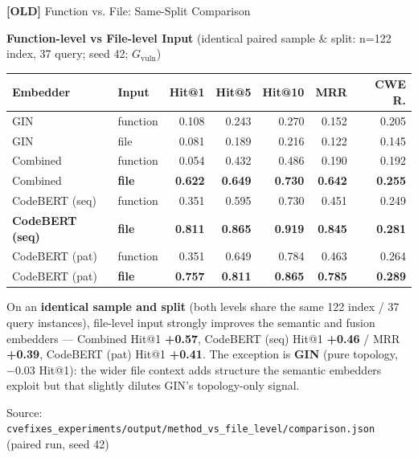 \documentclass[aspectratio=169,10pt]{beamer}
\begin{document}
\begin{frame}{\textbf{[OLD]} Function vs. File: Same-Split Comparison}

  \begin{center}
    {\small\textbf{Function-level vs File-level Input} {\scriptsize(identical paired sample \& split: n=122 index, 37 query; seed 42; $G_{\mathrm{vuln}}$)}}\\[4pt]
  {\scriptsize
  \renewcommand{\arraystretch}{1.15}
  \setlength{\tabcolsep}{4pt}
    \begin{tabular}{llrrrrr}
      \toprule
      \textbf{Embedder} & \textbf{Input} & \textbf{Hit@1} & \textbf{Hit@5} & \textbf{Hit@10} & \textbf{MRR} & \textbf{CWE R.} \\
      \midrule
      GIN & function & 0.108 & 0.243 & 0.270 & 0.152 & 0.205 \\
      \rowcolor{miss!15}
      GIN & file & 0.081 & 0.189 & 0.216 & 0.122 & 0.145 \\
      \midrule
      Combined & function & 0.054 & 0.432 & 0.486 & 0.190 & 0.192 \\
      \rowcolor{hit!12}
      Combined & \textbf{file} & \textbf{0.622} & \textbf{0.649} & \textbf{0.730} & \textbf{0.642} & \textbf{0.255} \\
      \midrule
      CodeBERT (seq) & function & 0.351 & 0.595 & 0.730 & 0.451 & 0.249 \\
      \rowcolor{hit!12}
      \textbf{CodeBERT (seq)} & \textbf{file} & \textbf{0.811} & \textbf{0.865} & \textbf{0.919} & \textbf{0.845} & \textbf{0.281} \\
      \midrule
      CodeBERT (pat) & function & 0.351 & 0.649 & 0.784 & 0.463 & 0.264 \\
      \rowcolor{hit!12}
      CodeBERT (pat) & \textbf{file} & \textbf{0.757} & \textbf{0.811} & \textbf{0.865} & \textbf{0.785} & \textbf{0.289} \\
      \bottomrule
    \end{tabular}}
  \end{center}

  \vspace{0.35em}
  \begin{tcolorbox}[colback=hit!5, colframe=hit!70!black, boxrule=0.35pt,
    left=3pt, right=3pt, top=2pt, bottom=1pt, arc=2pt, width=\linewidth]
    \scriptsize
    On an \textbf{identical sample and split} (both levels share the same 122 index / 37
    query instances), file-level input strongly improves the semantic and fusion
    embedders --- Combined Hit@1 \textbf{+0.57}, CodeBERT (seq) Hit@1 \textbf{+0.46} /
    MRR \textbf{+0.39}, CodeBERT (pat) Hit@1 \textbf{+0.41}. The exception is
    \textbf{GIN} (pure topology, \textcolor{miss}{$-0.03$} Hit@1): the wider file context
    adds structure the semantic embedders exploit but that slightly dilutes GIN's
    topology-only signal.
  \end{tcolorbox}

  \vspace{0.2em}
  {\scriptsize\textcolor{notecol}{Source: \texttt{cvefixes\_experiments/output/method\_vs\_file\_level/comparison.json} (paired run, seed 42)}}

\end{frame}
\end{document}
